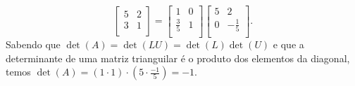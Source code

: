 \documentclass[a4paper,12pt]{article}
\begin{document}
\begin{enumerate}
    $$
    \begin{bmatrix}
        5 & 2 \\
        3 & 1  \\
    \end{bmatrix} = 
        \begin{bmatrix}
        1 & 0 \\
        \frac{3}{5} & 1 \\
    \end{bmatrix}
    \begin{bmatrix}
        5 & 2 \\
        0 & -\frac{1}{5} \\
    \end{bmatrix}.
    $$
    Sabendo que $\det(A) = \det(LU) = \det(L)\det(U)$ e que a determinante de uma matriz trianguilar é o produto dos elementos da diagonal, temos $\det(A) = (1 \cdot 1) \cdot (5 \cdot \frac{-1}{5}) = -1$.



\end{enumerate}
\end{document}
